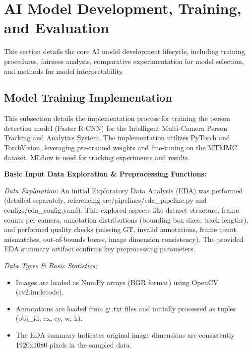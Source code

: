\section{AI Model Development, Training, and Evaluation}
\label{section:ai_model_dev_train_eval}

This section details the core AI model development lifecycle, including training procedures, fairness analysis, comparative experimentation for model selection, and methods for model interpretability.

\subsection{Model Training Implementation}
\label{subsection:model_training_impl}
This subsection details the implementation process for training the person detection model (Faster R-CNN) for the Intelligent Multi-Camera Person Tracking and Analytics System. The implementation utilizes PyTorch and TorchVision, leveraging pre-trained weights and fine-tuning on the MTMMC dataset. MLflow is used for tracking experiments and results.

\textbf{Basic Input Data Exploration \& Preprocessing Functions:}

\textit{Data Exploration:} An initial Exploratory Data Analysis (EDA) was performed (detailed separately, referencing src/pipelines/eda\_pipeline.py and configs/eda\_config.yaml). This explored aspects like dataset structure, frame counts per camera, annotation distributions (bounding box sizes, track lengths), and performed quality checks (missing GT, invalid annotations, frame count mismatches, out-of-bounds boxes, image dimension consistency). The provided EDA summary artifact confirms key preprocessing parameters.

\textit{Data Types \& Basic Statistics:}
\begin{itemize}
    \item Images are loaded as NumPy arrays (BGR format) using OpenCV (cv2.imdecode).
    \item Annotations are loaded from gt.txt files and initially processed as tuples (obj\_id, cx, cy, w, h).
    \item The EDA summary indicates original image dimensions are consistently 1920x1080 pixels in the sampled data.
\end{itemize}

